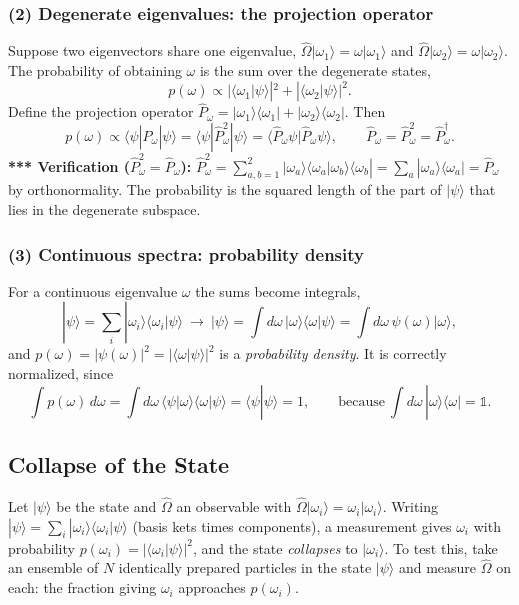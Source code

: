 \documentclass[11pt,a4paper]{article}
\begin{document}
\subsubsection*{(2) Degenerate eigenvalues: the projection operator}
Suppose two eigenvectors share one eigenvalue, $\hat\Omega|\omega_1\rangle=\omega|\omega_1\rangle$ and $\hat\Omega|\omega_2\rangle=\omega|\omega_2\rangle$. The probability of obtaining $\omega$ is the sum over the degenerate states,
\[
p(\omega)\propto|\langle\omega_1|\psi\rangle|^2+|\langle\omega_2|\psi\rangle|^2 .
\]
Define the projection operator $\hat P_\omega=|\omega_1\rangle\langle\omega_1|+|\omega_2\rangle\langle\omega_2|$. Then
\[
p(\omega)\propto\langle\psi|\hat P_\omega|\psi\rangle=\langle\psi|\hat P_\omega^2|\psi\rangle=\langle\hat P_\omega\psi|\hat P_\omega\psi\rangle,\qquad
\hat P_\omega=\hat P_\omega^2=\hat P_\omega^\dagger .
\]
\textbf{*** Verification ($\hat P_\omega^2=\hat P_\omega$):} $\hat P_\omega^2=\sum_{a,b=1}^2|\omega_a\rangle\langle\omega_a|\omega_b\rangle\langle\omega_b|=\sum_a|\omega_a\rangle\langle\omega_a|=\hat P_\omega$ by orthonormality. The probability is the squared length of the part of $|\psi\rangle$ that lies in the degenerate subspace.

\subsubsection*{(3) Continuous spectra: probability density}
For a continuous eigenvalue $\omega$ the sums become integrals,
\[
|\psi\rangle=\sum_i|\omega_i\rangle\langle\omega_i|\psi\rangle\ \longrightarrow\ |\psi\rangle=\int d\omega\,|\omega\rangle\langle\omega|\psi\rangle=\int d\omega\,\psi(\omega)|\omega\rangle,
\]
and $p(\omega)=|\psi(\omega)|^2=|\langle\omega|\psi\rangle|^2$ is a \emph{probability density}. It is correctly normalized, since
\[
\int p(\omega)\,d\omega=\int d\omega\,\langle\psi|\omega\rangle\langle\omega|\psi\rangle=\langle\psi|\psi\rangle=1,\qquad\text{because}\ \int d\omega\,|\omega\rangle\langle\omega|=\mathbb 1 .
\]

\subsection{Collapse of the State}
Let $|\psi\rangle$ be the state and $\hat\Omega$ an observable with $\hat\Omega|\omega_i\rangle=\omega_i|\omega_i\rangle$. Writing $|\psi\rangle=\sum_i|\omega_i\rangle\langle\omega_i|\psi\rangle$ (basis kets times components), a measurement gives $\omega_i$ with probability $p(\omega_i)=|\langle\omega_i|\psi\rangle|^2$, and the state \emph{collapses} to $|\omega_i\rangle$. To test this, take an ensemble of $N$ identically prepared particles in the state $|\psi\rangle$ and measure $\hat\Omega$ on each: the fraction giving $\omega_i$ approaches $p(\omega_i)$.
\end{document}

